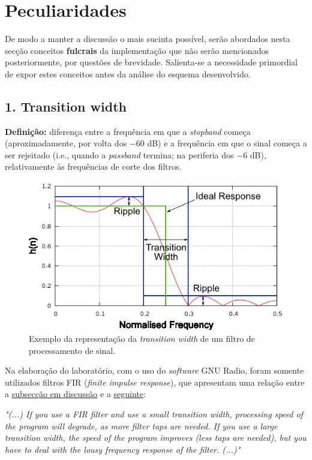 \newpage
\section{Peculiaridades}
\label{sec:peculiaridades}
De modo a manter a discussão o mais sucinta possível, serão abordados nesta secção conceitos \textbf{fulcrais} da implementação que não serão mencionados posteriormente, por questões de brevidade. Salienta-se a necessidade primordial de expor estes conceitos antes da análise do esquema desenvolvido. 
\subsection{1. Transition width}
\label{subsec:transition-width}
\textbf{Definição:} diferença entre a frequência em que a \textit{stopband} começa (aproximadamente, por volta dos $-60$ dB) e a frequência em que o sinal começa a ser rejeitado (i.e., quando a \textit{passband} termina; na periferia dos $-6$ dB), relativamente às frequências de corte dos filtros.

\begin{figure}[H]
    \centering
    \includegraphics[width = 0.7\linewidth]{img/transition-width.png}
    \caption{Exemplo da representação da \textit{transition width} de um filtro de processamento de sinal.}
    \label{fig:transition-width}
\end{figure}

Na elaboração do laboratório, com o uso do \textit{software} GNU Radio, foram somente utilizados filtros FIR (\textit{finite impulse response}), que apresentam uma relação entre a \hyperref[subsec:transition-width]{subsecção em discussão} e a \hyperref[subsec:delay]{seguinte}:

\textit{"(...) If you use a FIR filter and use a small transition width, processing speed of the program will degrade, as more filter taps are needed. If you use a large transition width, the speed of the program improves (less taps are needed), but you have to deal with the lousy frequency response of the filter. (...)"}\cite{fwd:transitionwidth}

